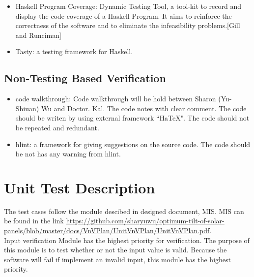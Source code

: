 \documentclass[12pt, titlepage]{article}
\begin{document}
\begin{itemize}

\item Haskell Program Coverage: Dynamic Testing Tool, a tool-kit to record 
and display the code coverage of a Haskell Program. It aims to reinforce the 
correctness of the software and to eliminate the infeasibility problems.[Gill
and Runciman] \cite{GillandRunciman}
\item Tasty: a testing framework for Haskell.

\end{itemize} 


\subsection{Non-Testing Based Verification}

\begin{itemize}
\item code walkthrough: Code walkthrough will be hold between Sharon (Yu-Shiuan) Wu and Doctor. Kal. The code notes with clear comment. The code should be writen by using external framework ``HaTeX". The code should not be repeated and redundant.
\item hlint: a framework for giving suggestions on the source code. The code should be not has any warning from hlint.
\end{itemize} 

\section{Unit Test Description}

The test cases follow the module descibed in designed document, MIS. MIS can be found in the link \url{https://github.com/sharyuwu/optimum-tilt-of-solar-panels/blob/master/docs/VnVPlan/UnitVnVPlan/UnitVnVPlan.pdf}.\\

Input verification Module has the highest priority for verification. The purpose of this module is to test whether or not the input value is valid. Because the software will fail if implement an invalid input, this module has the highest priority. \\
\end{document}

